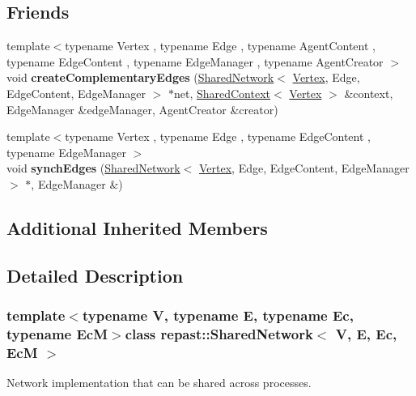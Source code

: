 \subsection*{Friends}
\begin{DoxyCompactItemize}
\item 
\hypertarget{classrepast_1_1_shared_network_aab38d29bc953ebb66d39ecb27f392acf}{{\footnotesize template$<$typename Vertex , typename Edge , typename Agent\-Content , typename Edge\-Content , typename Edge\-Manager , typename Agent\-Creator $>$ }\\void {\bfseries create\-Complementary\-Edges} (\hyperlink{classrepast_1_1_shared_network}{Shared\-Network}$<$ \hyperlink{classrepast_1_1_vertex}{Vertex}, Edge, Edge\-Content, Edge\-Manager $>$ $\ast$net, \hyperlink{classrepast_1_1_shared_context}{Shared\-Context}$<$ \hyperlink{classrepast_1_1_vertex}{Vertex} $>$ \&context, Edge\-Manager \&edge\-Manager, Agent\-Creator \&creator)}\label{classrepast_1_1_shared_network_aab38d29bc953ebb66d39ecb27f392acf}

\item 
\hypertarget{classrepast_1_1_shared_network_a97ffdbe7b82199b6b83c1f581c820a85}{{\footnotesize template$<$typename Vertex , typename Edge , typename Edge\-Content , typename Edge\-Manager $>$ }\\void {\bfseries synch\-Edges} (\hyperlink{classrepast_1_1_shared_network}{Shared\-Network}$<$ \hyperlink{classrepast_1_1_vertex}{Vertex}, Edge, Edge\-Content, Edge\-Manager $>$ $\ast$, Edge\-Manager \&)}\label{classrepast_1_1_shared_network_a97ffdbe7b82199b6b83c1f581c820a85}

\end{DoxyCompactItemize}
\subsection*{Additional Inherited Members}


\subsection{Detailed Description}
\subsubsection*{template$<$typename V, typename E, typename Ec, typename Ec\-M$>$class repast\-::\-Shared\-Network$<$ V, E, Ec, Ec\-M $>$}

Network implementation that can be shared across processes. 

